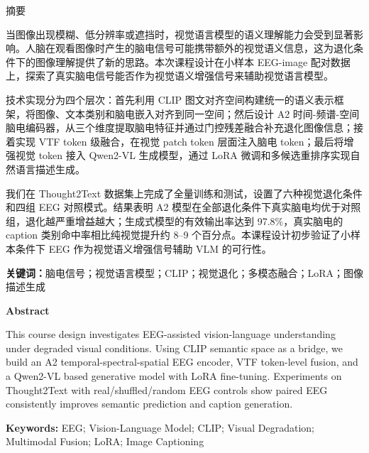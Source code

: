 \begin{center}
{\heitifont{} 摘\quad 要}
\end{center}

当图像出现模糊、低分辨率或遮挡时，视觉语言模型的语义理解能力会受到显著影响。人脑在观看图像时产生的脑电信号可能携带额外的视觉语义信息，这为退化条件下的图像理解提供了新的思路。本次课程设计在小样本 EEG-image 配对数据上，探索了真实脑电信号能否作为视觉语义增强信号来辅助视觉语言模型。

技术实现分为四个层次：首先利用 CLIP 图文对齐空间构建统一的语义表示框架，将图像、文本类别和脑电嵌入对齐到同一空间；然后设计 A2 时间-频谱-空间脑电编码器，从三个维度提取脑电特征并通过门控残差融合补充退化图像信息；接着实现 VTF token 级融合，在视觉 patch token 层面注入脑电 token；最后将增强视觉 token 接入 Qwen2-VL 生成模型，通过 LoRA 微调和多候选重排序实现自然语言描述生成。

我们在 Thought2Text 数据集上完成了全量训练和测试，设置了六种视觉退化条件和四组 EEG 对照模式。结果表明 A2 模型在全部退化条件下真实脑电均优于对照组，退化越严重增益越大；生成式模型的有效输出率达到 97.8\%，真实脑电的 caption 类别命中率相比纯视觉提升约 8--9 个百分点。本课程设计初步验证了小样本条件下 EEG 作为视觉语义增强信号辅助 VLM 的可行性。

\vspace{0.5cm}
\noindent\textbf{关键词：}脑电信号；视觉语言模型；CLIP；视觉退化；多模态融合；LoRA；图像描述生成

\clearpage
\begin{center}
{\bfseries{} Abstract}
\end{center}

This course design investigates EEG-assisted vision-language understanding under degraded visual conditions. Using CLIP semantic space as a bridge, we build an A2 temporal-spectral-spatial EEG encoder, VTF token-level fusion, and a Qwen2-VL based generative model with LoRA fine-tuning. Experiments on Thought2Text with real/shuffled/random EEG controls show paired EEG consistently improves semantic prediction and caption generation.

\vspace{0.5cm}
\noindent\textbf{Keywords:} EEG; Vision-Language Model; CLIP; Visual Degradation; Multimodal Fusion; LoRA; Image Captioning
